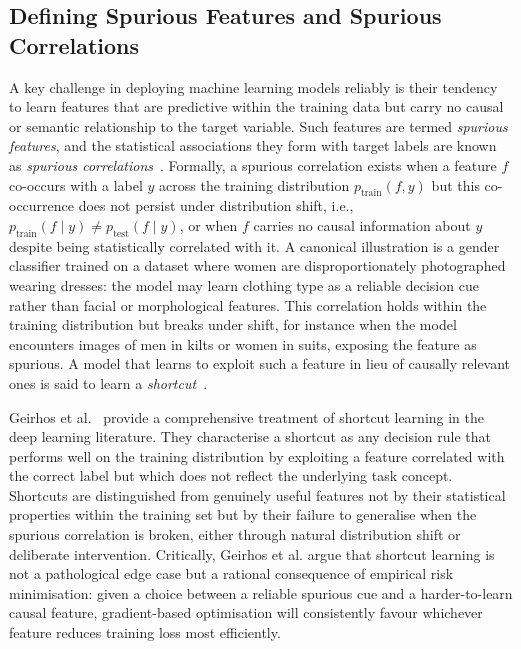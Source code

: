\subsection*{Defining Spurious Features and Spurious Correlations}
A key challenge in deploying machine learning models reliably is their tendency to learn
features that are predictive within the training data but carry no causal or semantic
relationship to the target variable. Such features are termed \emph{spurious features}, and
the statistical associations they form with target labels are known as \emph{spurious correlations}~\cite{Arjovsky_2020_InvariantRiskMinimization,Sagawa_2020_DistributionallyRobustNeuralNetworksForGroupShifts}. Formally, a spurious correlation exists when a feature $f$ co-occurs with a label $y$ across the training distribution $p_{\text{train}}(f, y)$ but this co-occurrence does not persist under distribution shift, i.e., $p_{\text{train}}(f \mid y) \neq p_{\text{test}}(f \mid y)$, or
when $f$ carries no causal information about $y$ despite being statistically correlated with
it. A canonical illustration is a gender classifier trained on a dataset where women are
disproportionately photographed wearing dresses: the model may learn clothing type as a
reliable decision cue rather than facial or morphological features. This correlation holds
within the training distribution but breaks under shift, for instance when the model
encounters images of men in kilts or women in suits, exposing the feature as spurious. A
model that learns to exploit such a feature in lieu of causally relevant ones is said to
learn a \emph{shortcut}~\cite{Geirhos_2020_ShortcutLearningInDeepNeuralNetworks}.

Geirhos et al.~\cite{Geirhos_2020_ShortcutLearningInDeepNeuralNetworks} provide a
comprehensive treatment of shortcut learning in the deep learning literature. They
characterise a shortcut as any decision rule that performs well on the training distribution
by exploiting a feature correlated with the correct label but which does not reflect the
underlying task concept. Shortcuts are distinguished from genuinely useful features not by
their statistical properties within the training set but by their failure to generalise when
the spurious correlation is broken, either through natural distribution shift or deliberate
intervention. Critically, Geirhos et al. argue that shortcut learning is not a pathological
edge case but a rational consequence of empirical risk minimisation: given a choice between a
reliable spurious cue and a harder-to-learn causal feature, gradient-based optimisation will
consistently favour whichever feature reduces training loss most efficiently.

